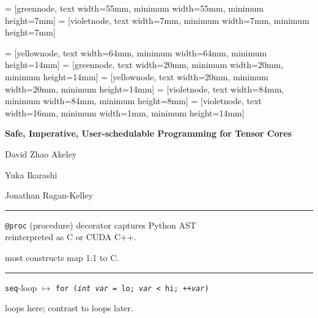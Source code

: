  = [greennode, text width=55mm, minimum width=55mm, minimum height=7mm]
 = [violetnode, text width=7mm, minimum width=7mm, minimum height=7mm]

 = [yellownode, text width=64mm, minimum width=64mm, minimum height=14mm]
 = [greennode, text width=20mm, minimum width=20mm, minimum height=14mm]
 = [yellownode, text width=20mm, minimum width=20mm, minimum height=14mm]
 = [violetnode, text width=84mm, minimum width=84mm, minimum height=8mm]
 = [violetnode, text width=16mm, minimum width=1mm, minimum height=14mm]
\newcommand{\consumerBox}[1]{{\color{greenBoxFg}\colorbox{greenBoxBg}{#1}}}
\newcommand{\producerBox}[1]{{\color{yellowBoxFg}\colorbox{yellowBoxBg}{#1}}}


\textbf{\hfill \Large Safe, Imperative, User-schedulable Programming for Tensor Cores}

{\LARGE

\vfill

David Zhao Akeley

Yuka Ikarashi

Jonathan Ragan-Kelley

\hfill {}}


\newpage
{}

{\large

}

\vspace{3mm}
\hrule

{\LARGE
\texttt{@proc} (procedure) decorator captures Python AST\\reinterpreted as C or CUDA C++.

 most constructs map 1:1 to C.

}

\newpage
{}

{\large

}

\vspace{3mm}
\hrule

{\LARGE
\texttt{seq}-loop $\mapsto$ \texttt{for (\textit{int var} = lo; \textit{var} < hi; ++\textit{var})}

 loops here; contrast to  loops later.

}

